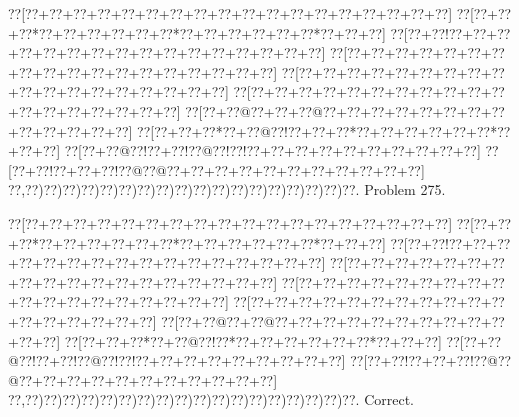 \documentclass[a5paper]{article}
\begin{document}
\newpage
\begin{center}
{\goo
\0??[\0??+\0??+\0??+\0??+\0??+\0??+\0??+\0??+\0??+\0??+\0??+\0??+\0??+\0??+\0??+\0??+\0??+\0??]
\0??[\0??+\0??+\0??*\0??+\0??+\0??+\0??+\0??+\0??*\0??+\0??+\0??+\0??+\0??+\0??*\0??+\0??+\0??]
\0??[\0??+\0??!\0??+\0??+\0??+\0??+\0??+\0??+\0??+\0??+\0??+\0??+\0??+\0??+\0??+\0??+\0??+\0??]
\0??[\0??+\0??+\0??+\0??+\0??+\0??+\0??+\0??+\0??+\0??+\0??+\0??+\0??+\0??+\0??+\0??+\0??+\0??]
\0??[\0??+\0??+\0??+\0??+\0??+\0??+\0??+\0??+\0??+\0??+\0??+\0??+\0??+\0??+\0??+\0??+\0??+\0??]
\0??[\0??+\0??+\0??+\0??+\0??+\0??+\0??+\0??+\0??+\0??+\0??+\0??+\0??+\0??+\0??+\0??+\0??+\0??]
\0??[\0??+\0??@\0??+\0??+\0??@\0??+\0??+\0??+\0??+\0??+\0??+\0??+\0??+\0??+\0??+\0??+\0??+\0??]
\0??[\0??+\0??+\0??*\0??+\0??@\0??!\0??+\0??+\0??*\0??+\0??+\0??+\0??+\0??+\0??*\0??+\0??+\0??]
\0??[\0??+\0??@\0??!\0??+\0??!\0??@\0??!\0??!\0??+\0??+\0??+\0??+\0??+\0??+\0??+\0??+\0??+\0??]
\0??[\0??+\0??!\0??+\0??+\0??!\0??@\0??@\0??+\0??+\0??+\0??+\0??+\0??+\0??+\0??+\0??+\0??+\0??]
\0??,\0??)\0??)\0??)\0??)\0??)\0??)\0??)\0??)\0??)\0??)\0??)\0??)\0??)\0??)\0??)\0??)\0??)\0??.
}
Problem 275.

\end{center}
\begin{center}
{\goo
\0??[\0??+\0??+\0??+\0??+\0??+\0??+\0??+\0??+\0??+\0??+\0??+\0??+\0??+\0??+\0??+\0??+\0??+\0??]
\0??[\0??+\0??+\0??*\0??+\0??+\0??+\0??+\0??+\0??*\0??+\0??+\0??+\0??+\0??+\0??*\0??+\0??+\0??]
\0??[\0??+\0??!\0??+\0??+\0??+\0??+\0??+\0??+\0??+\0??+\0??+\0??+\0??+\0??+\0??+\0??+\0??+\0??]
\0??[\0??+\0??+\0??+\0??+\0??+\0??+\0??+\0??+\0??+\0??+\0??+\0??+\0??+\0??+\0??+\0??+\0??+\0??]
\0??[\0??+\0??+\0??+\0??+\0??+\0??+\0??+\0??+\0??+\0??+\0??+\0??+\0??+\0??+\0??+\0??+\0??+\0??]
\0??[\0??+\0??+\0??+\0??+\0??+\0??+\0??+\0??+\0??+\0??+\0??+\0??+\0??+\0??+\0??+\0??+\0??]
\0??[\0??+\0??@\0??+\0??@\0??+\0??+\0??+\0??+\0??+\0??+\0??+\0??+\0??+\0??+\0??+\0??]
\0??[\0??+\0??+\0??*\0??+\0??@\0??!\0??*\0??+\0??+\0??+\0??+\0??+\0??*\0??+\0??+\0??]
\0??[\0??+\0??@\0??!\0??+\0??!\0??@\0??!\0??!\0??+\0??+\0??+\0??+\0??+\0??+\0??+\0??+\0??]
\0??[\0??+\0??!\0??+\0??+\0??!\0??@\0??@\0??+\0??+\0??+\0??+\0??+\0??+\0??+\0??+\0??+\0??+\0??]
\0??,\0??)\0??)\0??)\0??)\0??)\0??)\0??)\0??)\0??)\0??)\0??)\0??)\0??)\0??)\0??)\0??)\0??)\0??.
}
Correct. 

\end{center}
\end{document}
